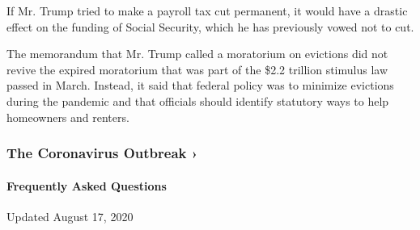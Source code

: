 If Mr. Trump tried to make a payroll tax cut permanent, it would have a
drastic effect on the funding of Social Security, which he has
previously vowed not to cut.

The memorandum that Mr. Trump called a moratorium on evictions did not
revive the expired moratorium that was part of the \$2.2 trillion
stimulus law passed in March. Instead, it said that federal policy was
to minimize evictions during the pandemic and that officials should
identify statutory ways to help homeowners and renters.

\href{https://www.nytimes3xbfgragh.onion/news-event/coronavirus?action=click\&pgtype=Article\&state=default\&region=MAIN_CONTENT_3\&context=storylines_faq}{}

\hypertarget{the-coronavirus-outbreak-}{%
\subsubsection{The Coronavirus Outbreak
›}\label{the-coronavirus-outbreak-}}

\hypertarget{frequently-asked-questions}{%
\paragraph{Frequently Asked
Questions}\label{frequently-asked-questions}}

Updated August 17, 2020

